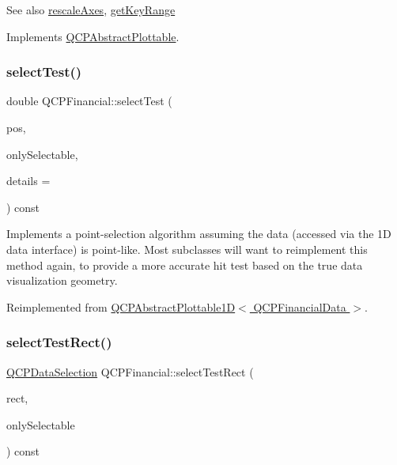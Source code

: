 \begin{DoxySeeAlso}{See also}
\hyperlink{class_q_c_p_abstract_plottable_a1491c4a606bccd2d09e65e11b79eb882}{rescale\+Axes}, \hyperlink{class_q_c_p_financial_a15d68fb257113fef697356d65fa76559}{get\+Key\+Range} 
\end{DoxySeeAlso}


Implements \hyperlink{class_q_c_p_abstract_plottable_a4de773988b21ed090fddd27c6a3a3dcb}{Q\+C\+P\+Abstract\+Plottable}.

\mbox{\label{class_q_c_p_financial_aac8e91622ac58330fa9ce81cc8fd40ee}} 
\subsubsection{\texorpdfstring{select\+Test()}{selectTest()}}
{\footnotesize\ttfamily double Q\+C\+P\+Financial\+::select\+Test (\begin{DoxyParamCaption}\item[{const Q\+PointF \&}]{pos,  }\item[{bool}]{only\+Selectable,  }\item[{Q\+Variant $\ast$}]{details = {} }\end{DoxyParamCaption}) const\hspace{0.3cm}{\ttfamily [virtual]}}

Implements a point-\/selection algorithm assuming the data (accessed via the 1D data interface) is point-\/like. Most subclasses will want to reimplement this method again, to provide a more accurate hit test based on the true data visualization geometry.

Reimplemented from \hyperlink{class_q_c_p_abstract_plottable1_d_a071e2df66ba1746067dfcb5e27947b43}{Q\+C\+P\+Abstract\+Plottable1\+D$<$ Q\+C\+P\+Financial\+Data $>$}.

\mbox{\label{class_q_c_p_financial_a3c5beb1ab028a1dba845fc9dcffc7cf4}} 
\subsubsection{\texorpdfstring{select\+Test\+Rect()}{selectTestRect()}}
{\footnotesize\ttfamily \hyperlink{class_q_c_p_data_selection}{Q\+C\+P\+Data\+Selection} Q\+C\+P\+Financial\+::select\+Test\+Rect (\begin{DoxyParamCaption}\item[{const Q\+RectF \&}]{rect,  }\item[{bool}]{only\+Selectable }\end{DoxyParamCaption}) const\hspace{0.3cm}{\ttfamily [virtual]}}





